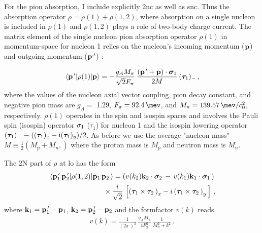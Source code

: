     For the pion absorption, I include explicitly \gls{2nc} as well as \gls{snc}.
    Thus the absorption operator $\rho = \rho(1) + \rho(1, 2)$,
    where absorption on  a single nucleon is included in $\rho(1)$ and
    $\rho(1, 2)$ plays a role of two-body charge current.
    The matrix element of the single nucleon pion absorption operator $\rho(1)$ in momentum-space for nucleon 1 relies on the
    nucleon's incoming momentum (${\bf p}$) and outgoing momentum (${\bf p}^{, \prime}$) \cite{BERNARD_1995}:

    \begin{eqnarray}
        \matrixel{{\bf p}^{\, \prime}} 
        {\rho(1)} {{\bf p}} = 
        - \frac{g_A M_\pi}{\sqrt{2} F_\pi } \,
            \frac{ \left( {\bf p}^{\, \prime} +  {\bf p} \right) \cdot {\bm \sigma}_1 } { 2 M } \, 
            ({\bm \tau}_{1})_- \, ,
    \label{rho1}
    \end{eqnarray}
    where the values of the nucleon axial vector coupling, pion decay constant, and negative pion mass are $g_A =$ 1.29, 
    $F_\pi = \SI{92.4}{\mev}$, and $M_\pi = \SI{139.57}{\mev \per \clight\squared}$, respectively. $\rho (1)$ operates in the spin
    and isospin spaces and involves the Pauli spin (isospin) operator ${\bf \sigma}_1$ ($\tau_1$) for nucleon 1 and the isospin lowering operator
    $({\bm \tau}_{1})_- \equiv(({\bm \tau}_1)_x -{\rm i} ({\bm \tau}_1)_y)/2$.
    As before we use the average 
    "nucleon mass" $M \equiv \frac{1}{2} \left( M_p + M_n , \right)$ where the proton mass is $M_p$ and neutron mass is $M_n$.



    The 2N part of $\rho$ at \gls{lo} has the form \cite{Lensky2006}
    \begin{eqnarray}
    \matrixel{
        {\bf p}_1^{\, \prime}\,
        {\bf p}_2^{\, \prime}
        } 
    {\rho(1,2)}
    {
        {\bf p}_1 \, 
        {\bf p}_2 \, 
        } = 
        \left(
        v( k_2 )  {\bf k}_2 \cdot {\bm \sigma}_2 \, - \, 
        v( k_1 )  {\bf k}_1 \cdot {\bm \sigma}_1 \,
        \right) \, \nonumber \\ \times \,
        \frac{i}{\sqrt{2}} \, 
        \left[ 
            \left( {\bm \tau}_1 \times {\bm \tau}_2 \, \right)_x 
            - i \left( {\bm \tau}_1 \times {\bm \tau}_2 \, \right)_y \,
        \right] \,,
    \label{rho12}
    \end{eqnarray}
    where 
    $ {\bf k}_1 = {\bf p}_1^{\, \prime} - {\bf p}_1 $,
    $ {\bf k}_2 = {\bf p}_2^{\, \prime} - {\bf p}_2 $
    and the formfactor $v(k)$ reads 
    \begin{eqnarray}
    v (k) = \frac 1{ \left( 2 \pi \, \right)^3 } \,
            \frac{g_A M_\pi}{4 F_\pi^3 } \,
        \frac1{M_\pi^2 + k^2 } \, .
    \label{vk}
    \end{eqnarray}


